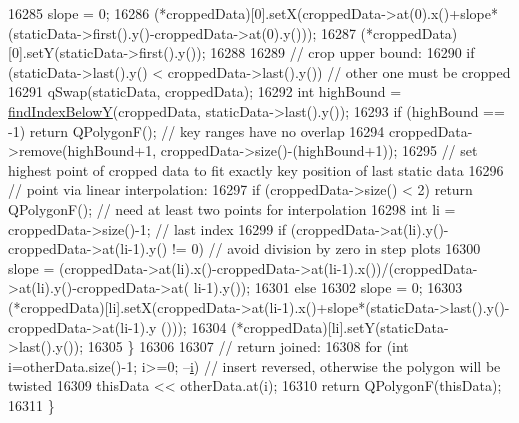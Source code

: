 \begin{DoxyCode}
16285       slope = 0;
16286     (*croppedData)[0].setX(croppedData->at(0).x()+slope*(staticData->first().y()-croppedData->at(0).y()));
16287     (*croppedData)[0].setY(staticData->first().y());
16288     
16289     \textcolor{comment}{// crop upper bound:}
16290     \textcolor{keywordflow}{if} (staticData->last().y() < croppedData->last().y()) \textcolor{comment}{// other one must be cropped}
16291       qSwap(staticData, croppedData);
16292     \textcolor{keywordtype}{int} highBound = \hyperlink{class_q_c_p_graph_a6c4d556de3d1e02f548401001f72c6ff}{findIndexBelowY}(croppedData, staticData->last().y());
16293     \textcolor{keywordflow}{if} (highBound == -1) \textcolor{keywordflow}{return} QPolygonF(); \textcolor{comment}{// key ranges have no overlap}
16294     croppedData->remove(highBound+1, croppedData->size()-(highBound+1));
16295     \textcolor{comment}{// set highest point of cropped data to fit exactly key position of last static data}
16296     \textcolor{comment}{// point via linear interpolation:}
16297     \textcolor{keywordflow}{if} (croppedData->size() < 2) \textcolor{keywordflow}{return} QPolygonF(); \textcolor{comment}{// need at least two points for interpolation}
16298     \textcolor{keywordtype}{int} li = croppedData->size()-1; \textcolor{comment}{// last index}
16299     \textcolor{keywordflow}{if} (croppedData->at(li).y()-croppedData->at(li-1).y() != 0) \textcolor{comment}{// avoid division by zero in step plots}
16300       slope = (croppedData->at(li).x()-croppedData->at(li-1).x())/(croppedData->at(li).y()-croppedData->at(
      li-1).y());
16301     \textcolor{keywordflow}{else}
16302       slope = 0;
16303     (*croppedData)[li].setX(croppedData->at(li-1).x()+slope*(staticData->last().y()-croppedData->at(li-1).y
      ()));
16304     (*croppedData)[li].setY(staticData->last().y());
16305   \}
16306   
16307   \textcolor{comment}{// return joined:}
16308   \textcolor{keywordflow}{for} (\textcolor{keywordtype}{int} i=otherData.size()-1; i>=0; --\hyperlink{_comparision_pictures_2_createtest_image_8m_a6f6ccfcf58b31cb6412107d9d5281426}{i}) \textcolor{comment}{// insert reversed, otherwise the polygon will be twisted}
16309     thisData << otherData.at(i);
16310   \textcolor{keywordflow}{return} QPolygonF(thisData);
16311 \}
\end{DoxyCode}


